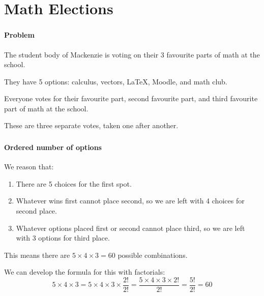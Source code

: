 \documentclass[mathserif]{beamer}
\newenvironment{namedframe}[1]%
	{\begin{frame}\frametitle{\secname}\framesubtitle{#1}}
	{\end{frame}}
\begin{document}
	\section{Math Elections}
	\begin{namedframe}{Problem}
		The student body of Mackenzie is voting on their 3 favourite parts of math at the school.

		They have 5 options: calculus, vectors, \textrm{\LaTeX{}}, Moodle, and math club.

		Everyone votes for their favourite part, second favourite part, and third favourite part of math at the school.

		These are three separate votes, taken one after another.
	\end{namedframe}
	\begin{namedframe}{Ordered number of options}
		We reason that:
		\begin{enumerate}[<+(1)->]
			\item There are 5 choices for the first spot.
			\item Whatever wins first cannot place second, so we are left with 4 choices for second place.
			\item Whatever options placed first or second cannot place third, so we are left with 3 options for third place.
		\end{enumerate}
		\pause
		This means there are $5 \times 4 \times 3 = 60$ possible combinations.
		
		We can develop the formula for this with factorials:
		\[5 \times 4 \times 3 = 5 \times 4 \times 3 \times \frac{2!}{2!} = \frac{5 \times 4 \times 3 \times 2!}{2!} = \frac{5!}{2!} = 60\]
	\end{namedframe}
\end{document}
